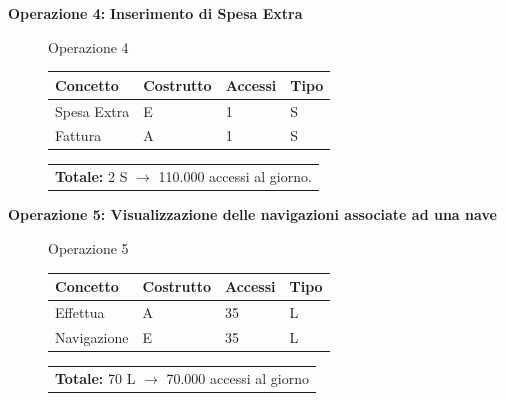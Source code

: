 \documentclass[a4paper, titlepage]{report}
\begin{document}
\vspace{1cm}
\noindent
\textbf{\large{Operazione 4:} }\textbf{Inserimento di Spesa Extra}
	
	\begin{figure}[h]
		\centering
		Operazione 4 \\
		\begin{tabular}{L{3cm}C{2.5cm}C{4.5cm}C{2.5cm}}
			\rule[-2mm]{0mm}{0.65cm}{}
			\textbf{Concetto} & \textbf{Costrutto} &\textbf{Accessi} & \textbf{Tipo} \\
			\hline\rule[-2mm]{0mm}{0.65cm}{}
			Spesa Extra & E & 1 & S \\
			\hline\rule[-2mm]{0mm}{0.65cm}{}
			Fattura & A & 1 & S \\
		\end{tabular}
		\begin{tabular}{C{13.9cm}}
			\rule[-4mm]{0mm}{1cm}{}	
			 \textbf{Totale:} 2 S $\to$ 110.000 accessi al giorno.
		\end{tabular}
	\end{figure}

\vspace{1cm}
\noindent
\textbf{\large{Operazione 5: }}\textbf{Visualizzazione delle navigazioni associate ad una nave}

	\begin{figure}[h!]
		\centering
		Operazione 5\\
		\begin{tabular}{L{3cm}C{2.5cm}C{4.5cm}C{2.5cm}}
			\rule[-2mm]{0mm}{0.65cm}{}
			\textbf{Concetto} & \textbf{Costrutto} &\textbf{Accessi} & \textbf{Tipo} \\
			\hline\rule[-2mm]{0mm}{0.65cm}{}
			Effettua & A & 35 & L \\
			\hline\rule[-2mm]{0mm}{0.65cm}{}
			Navigazione & E & 35 & L \\
		\end{tabular}
		\begin{tabular}{C{13.9cm}}
			\rule[-4mm]{0mm}{1cm}{}	
			 \textbf{Totale:} 70 L $\to$ 70.000 accessi al giorno
		\end{tabular}
	\end{figure}
\end{document}
